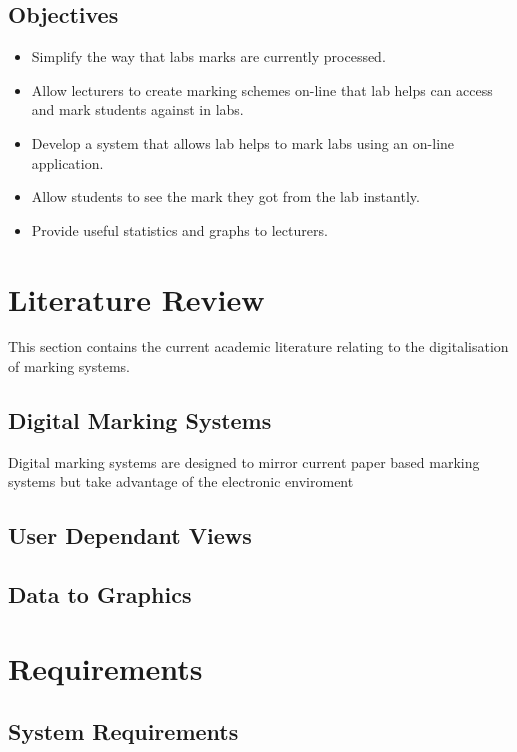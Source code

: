 \documentclass[12pt]{article}  %
\theoremstyle{definition}
\theoremstyle{remark}
\begin{document}
\subsection{Objectives}
\begin{itemize}
\item Simplify the way that labs marks are currently processed.
\item Allow lecturers to create marking schemes on-line that lab helps can access and mark students against in labs.
\item Develop a system that allows lab helps to mark labs using an on-line application.
\item Allow students to see the mark they got from the lab instantly.
\item Provide useful statistics and graphs to lecturers.
\end{itemize}






\newpage
\section{Literature Review}

This section contains the current academic literature relating to the digitalisation of marking systems. 
\subsection{Digital Marking Systems}
Digital marking systems are designed to mirror current paper based marking systems but take advantage of the electronic enviroment \cite{joy_effective_1998}

\subsection{User Dependant Views}


\subsection{Data to Graphics}





\newpage
\section{Requirements}
\subsection{System Requirements}
\end{document}
